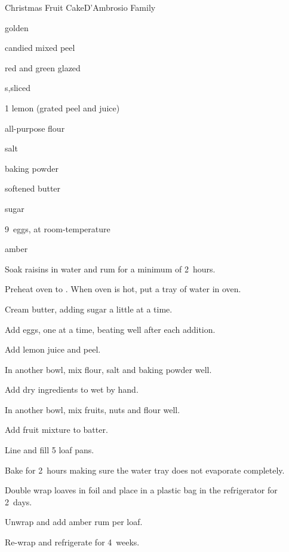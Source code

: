 \begin{recipe}{Christmas Fruit Cake}{D'Ambrosio Family}{}

\begin{ingredients}
\item {} golden 
\item {} candied mixed peel
\item \C{1\half} red and green glazed 
\item {} s,sliced 
\item 1 lemon (grated peel and juice)
\item \C{4\half} all-purpose flour
\item {} salt
\item {} baking powder
\item {} softened butter
\item {} sugar
\item 9~eggs, at room-temperature 
\item amber 
\end{ingredients}

\begin{directions}
\item Soak raisins in water and rum for a minimum of 2~hours.
\item Preheat oven to . When oven is hot, put a tray of water in oven.
\item Cream butter, adding sugar a little at a time.
\item Add eggs, one at a time, beating well after each addition.
\item Add lemon juice and peel.
\item In another bowl, mix  flour, salt and baking powder well.
\item Add dry ingredients to wet by hand.
\item In another bowl, mix fruits, nuts and \C{\half} flour well.
\item Add fruit mixture to batter.
\item Line and fill 5 loaf pans.
\item Bake for 2~hours making sure the water tray does not evaporate completely.
\item Double wrap loaves in foil and place in a plastic bag in the refrigerator for 2~days.
\item Unwrap and add \C{\third} amber rum per loaf.
\item Re-wrap and refrigerate for 4~weeks.
\end{directions}
\end{recipe}
